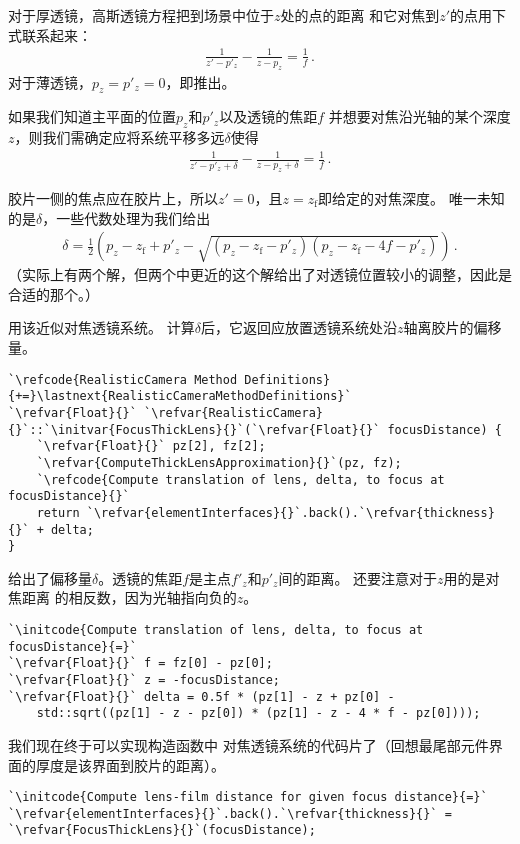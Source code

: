 对于厚透镜，高斯透镜方程把到场景中位于$z$处的点的距离
和它对焦到$z'$的点用下式联系起来：
\begin{align}\label{eq:6.3}
    \frac{1}{z'-p'_z}-\frac{1}{z-p_z}=\frac{1}{f}\, .
\end{align}
对于薄透镜，$p_z=p'_z=0$，即推出。

如果我们知道主平面的位置$p_z$和$p'_z$以及透镜的焦距$f$
并想要对焦沿光轴的某个深度$z$，则我们需确定应将系统平移多远$\delta$使得
\begin{align*}
    \frac{1}{z'-p'_z+\delta}-\frac{1}{z-p_z+\delta}=\frac{1}{f}\, .
\end{align*}

胶片一侧的焦点应在胶片上，所以$z'=0$，且$z=z_{\mathrm{f}}$即给定的对焦深度。
唯一未知的是$\delta$，一些代数处理为我们给出
\begin{align}\label{eq:6.4}
    \delta=\frac{1}{2}\left(p_z-z_{\mathrm{f}}+p'_z-\sqrt{(p_z-z_{\mathrm{f}}-p'_z)(p_z-z_{\mathrm{f}}-4f-p'_z)}\right)\, .
\end{align}
（实际上有两个解，但两个中更近的这个解给出了对透镜位置较小的调整，因此是合适的那个。）

用该近似对焦透镜系统。
计算$\delta$后，它返回应放置透镜系统处沿$z$轴离胶片的偏移量。
\begin{lstlisting}
`\refcode{RealisticCamera Method Definitions}{+=}\lastnext{RealisticCameraMethodDefinitions}`
`\refvar{Float}{}` `\refvar{RealisticCamera}{}`::`\initvar{FocusThickLens}{}`(`\refvar{Float}{}` focusDistance) {
    `\refvar{Float}{}` pz[2], fz[2];
    `\refvar{ComputeThickLensApproximation}{}`(pz, fz);
    `\refcode{Compute translation of lens, delta, to focus at focusDistance}{}`
    return `\refvar{elementInterfaces}{}`.back().`\refvar{thickness}{}` + delta;
}
\end{lstlisting}

给出了偏移量$\delta$。透镜的焦距$f$是主点$f'_z$和$p'_z$间的距离。
还要注意对于$z$用的是对焦距离
的相反数，因为光轴指向负的$z$。
\begin{lstlisting}
`\initcode{Compute translation of lens, delta, to focus at focusDistance}{=}`
`\refvar{Float}{}` f = fz[0] - pz[0];
`\refvar{Float}{}` z = -focusDistance;
`\refvar{Float}{}` delta = 0.5f * (pz[1] - z + pz[0] -
    std::sqrt((pz[1] - z - pz[0]) * (pz[1] - z - 4 * f - pz[0])));
\end{lstlisting}

我们现在终于可以实现构造函数中
对焦透镜系统的代码片了（回想最尾部元件界面的厚度是该界面到胶片的距离）。
\begin{lstlisting}
`\initcode{Compute lens-film distance for given focus distance}{=}`
`\refvar{elementInterfaces}{}`.back().`\refvar{thickness}{}` = `\refvar{FocusThickLens}{}`(focusDistance);
\end{lstlisting}

